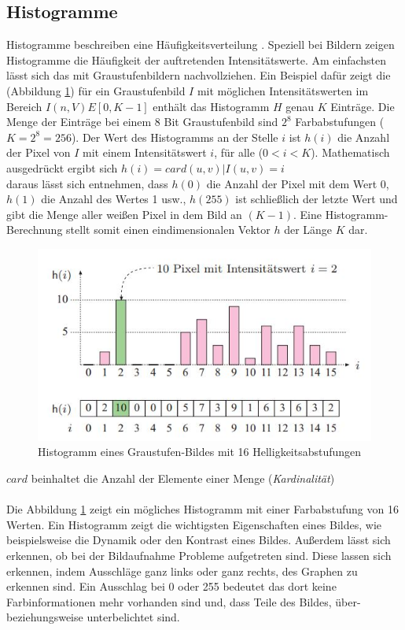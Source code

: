 \subsection{Histogramme}\label{s.histogramme}
Histogramme beschreiben eine Häufigkeitsverteilung \cite[42ff.]{burger2009digitale}. Speziell bei Bildern zeigen Histogramme die Häufigkeit der auftretenden Intensitätswerte. Am einfachsten lässt sich das mit Graustufenbildern nachvollziehen. Ein Beispiel dafür zeigt die (Abbildung \ref{img:histogramm}) für ein Graustufenbild $I$ mit möglichen Intensitätswerten im Bereich $I(n,V)E[0,K-1]$ enthält das Histogramm $H$ genau $K$ Einträge. Die Menge der Einträge bei einem 8 Bit Graustufenbild sind $2^8$ Farbabstufungen ($K=2^8=256$). Der Wert des Histogramms an der Stelle $i$ ist $h(i)$ die Anzahl der Pixel von $I$ mit einem Intensitätswert $i$, für alle ($0<i<K$). Mathematisch ausgedrückt ergibt sich $h(i)=card{(u,v) | I(u,v)=i}$\\
  daraus lässt sich entnehmen, dass $h(0)$ die Anzahl der Pixel mit dem Wert 0, $h(1)$ die Anzahl des Wertes 1 usw., $h(255)$ ist schließlich der letzte Wert und gibt die Menge aller weißen Pixel in dem Bild an $(K-1)$. Eine Histogramm-Berechnung stellt somit einen eindimensionalen Vektor $h$ der Länge $K$ dar.\\
  \begin{figure}
    [h]
    \centering
    \includegraphics[scale=0.8]{Sources/histogramm.jpg}
    \caption{Histogramm eines Graustufen-Bildes mit 16 Helligkeitsabstufungen \cite[42]{burger2009digitale}}
    \label{img:histogramm}
  \end{figure}
$card$ beinhaltet die Anzahl der Elemente einer Menge (\textit{Kardinalität})\\\\
Die Abbildung \ref{img:histogramm} zeigt ein mögliches Histogramm mit einer Farbabstufung von 16 Werten. Ein Histogramm zeigt die wichtigsten Eigenschaften eines Bildes, wie beispielsweise die Dynamik oder den Kontrast eines Bildes. Außerdem lässt sich erkennen, ob bei der Bildaufnahme Probleme aufgetreten sind. Diese lassen sich erkennen, indem Ausschläge ganz links oder ganz rechts, des Graphen zu erkennen sind. Ein Ausschlag bei 0 oder 255 bedeutet das dort keine Farbinformationen mehr vorhanden sind und, dass Teile des Bildes, über- beziehungsweise unterbelichtet sind.\\\\

